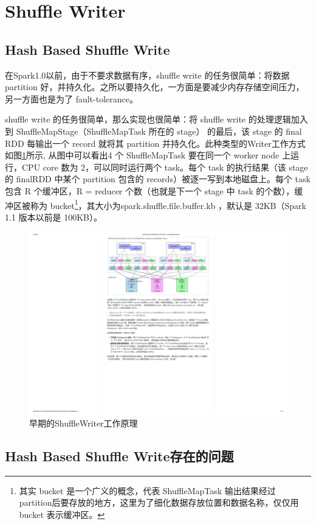 \section{Shuffle Writer}
\subsection{Hash Based Shuffle Write}
在Spark1.0以前，由于不要求数据有序，shuffle write 的任务很简单：将数据 partition 好，并持久化。之所以要持久化，一方面是要减少内存存储空间压力，另一方面也是为了 fault-tolerance。

shuffle write 的任务很简单，那么实现也很简单：将 shuffle write 的处理逻辑加入到 ShuffleMapStage（ShuffleMapTask 所在的 stage） 的最后，该 stage 的 final RDD 每输出一个 record 就将其 partition 并持久化。此种类型的Writer工作方式如图\ref{fig:hashShuffleWriter}所示, 从图中可以看出4 个 ShuffleMapTask 要在同一个 worker node 上运行，CPU core 数为 2，可以同时运行两个 task。每个 task 的执行结果（该 stage 的 finalRDD 中某个 partition 包含的 records）被逐一写到本地磁盘上。每个 task 包含 R 个缓冲区，R = reducer 个数（也就是下一个 stage 中 task 的个数），缓冲区被称为 bucket\footnote{其实 bucket 是一个广义的概念，代表 ShuffleMapTask 输出结果经过 partition后要存放的地方，这里为了细化数据存放位置和数据名称，仅仅用 bucket 表示缓冲区。}，其大小为spark.shuffle.file.buffer.kb ，默认是 32KB（Spark 1.1 版本以前是 100KB）。
\begin{figure}[H] 
	\centering
	\includegraphics[width=\textwidth]{figures/hashShuffleWriter.pdf}
	\caption{早期的ShuffleWriter工作原理}
	\label{fig:hashShuffleWriter}
\end{figure}
\subsection{Hash Based Shuffle Write存在的问题}

